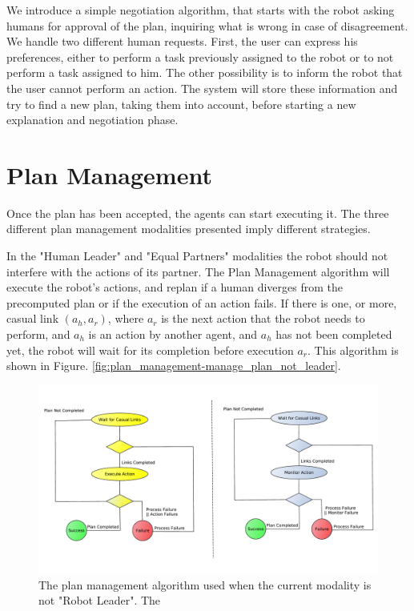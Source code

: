 We introduce a simple negotiation algorithm, that starts with the robot asking humans for approval of the plan, inquiring what is wrong in case of disagreement. We handle two different human requests. First, the user can express his preferences, either to perform a task previously assigned to the robot or to not perform a task assigned to him. The other possibility is to inform the robot that the user cannot perform an action. The system will store these information and try to find a new plan, taking them into account, before starting a new explanation and negotiation phase.
 
\section{Plan Management}
\label{sec:plan_management-planExecution}

Once the plan has been accepted, the agents can start executing it. The three different plan management modalities presented imply different strategies.

In the "Human Leader" and "Equal Partners" modalities the robot should not interfere with the actions of its partner. The Plan Management algorithm will execute the robot's actions, and replan if a human diverges from the precomputed plan or if the execution of an action fails. If there is one, or more, casual link $(a_h,a_r)$, where $a_r$ is the next action that the robot needs to perform, and $a_h$ is an action by another agent, and $a_h$ has not been completed yet, the robot will wait for its completion before execution $a_r$. This algorithm is shown in Figure. \ref{fig:plan_management-manage_plan_not_leader}. 

\begin{figure}[ht!]
 \centering
 \includegraphics[]{img/plan_management/manage_plan_not_leader.pdf}
 \caption{The plan management algorithm used when the current modality is not "Robot Leader". The}
 \label{fig:plan_management-manage_plan_not_leader. The algorithm is composed by different threads, one for each agent. In this instance, the left lane represents the robot's management thread, while the right a human's management thread. Elliptic nodes represent operations, while diamond nodes divergences in the algorithm.}
 \end{figure}



